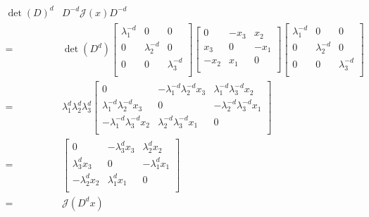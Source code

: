 \begin{align}
\det(D)^d& D^{-d}\mathcal{J}(x) D^{-d}
\nonumber \\
   =&\det(D^d)
    \left[ \begin{array}{ccc}
      \lambda_1^{-d}  &      0           &      0               \\
          0          &   \lambda_2^{-d}  &      0               \\
          0          &      0           & \lambda_3^{-d}        \\
    \end{array} \right]
    \left[ \begin{array}{ccc}
         0    & -x_3 &  x_2                               \\
         x_3  &   0  & -x_1                               \\
        -x_2  &  x_1 &    0                               \\
    \end{array} \right]
    \left[ \begin{array}{ccc}
      \lambda_1^{-d}  &      0           &      0               \\
          0          &   \lambda_2^{-d}  &      0               \\
          0          &      0           & \lambda_3^{-d}        \\
    \end{array} \right]
   \nonumber \\
   =&\lambda_1^d\lambda_2^d\lambda_3^d
    \left[ \begin{array}{ccc}
         0  &  -\lambda_1^{-d}\lambda_2^{-d}x_3  &  \lambda_1^{-d}\lambda_3^{-d}x_2     \\
          \lambda_1^{-d}\lambda_2^{-d}x_3  &  0  &  -\lambda_2^{-d}\lambda_3^{-d}x_1    \\
         -\lambda_1^{-d}\lambda_3^{-d}x_2  &  \lambda_2^{-d}\lambda_3^{-d}x_1 &    0    \\
    \end{array} \right]
   \nonumber \\
   =&
    \left[ \begin{array}{ccc}
         0  &  -\lambda_3^d x_3  &  \lambda_2^d x_2     \\
          \lambda_3^d x_3  &  0  &  -\lambda_1^d x_1    \\
         -\lambda_2^d x_2  &  \lambda_1^d x_1 &    0    \\
    \end{array} \right]
   \nonumber \\
   =&\mathcal{J}\left(D^d x \right)
\end{align}

